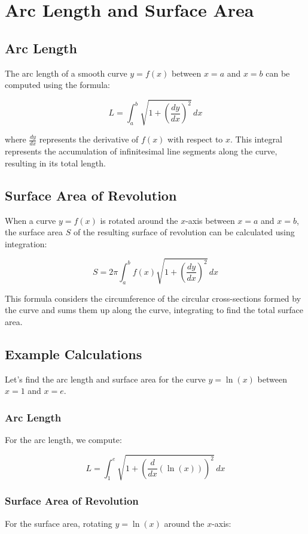 \documentclass{article}
\begin{document}
\section{Arc Length and Surface Area}
\subsection{Arc Length}
The arc length of a smooth curve $y = f(x)$ between $x = a$ and $x = b$ can be computed using the formula:

\[
L = \int_{a}^{b} \sqrt{1 + \left(\frac{dy}{dx}\right)^2} \, dx
\]

where $\frac{dy}{dx}$ represents the derivative of $f(x)$ with respect to $x$. This integral represents the accumulation of infinitesimal line segments along the curve, resulting in its total length.

\subsection{Surface Area of Revolution}
When a curve $y = f(x)$ is rotated around the $x$-axis between $x = a$ and $x = b$, the surface area $S$ of the resulting surface of revolution can be calculated using integration:

\[
S = 2\pi \int_{a}^{b} f(x) \sqrt{1 + \left(\frac{dy}{dx}\right)^2} \, dx
\]

This formula considers the circumference of the circular cross-sections formed by the curve and sums them up along the curve, integrating to find the total surface area.

\subsection{Example Calculations}
Let's find the arc length and surface area for the curve $y = \ln(x)$ between $x = 1$ and $x = e$.

\subsubsection{Arc Length}
For the arc length, we compute:

\[
L = \int_{1}^{e} \sqrt{1 + \left(\frac{d}{dx}(\ln(x))\right)^2} \, dx
\]

\subsubsection{Surface Area of Revolution}
For the surface area, rotating $y = \ln(x)$ around the $x$-axis:
\end{document}
